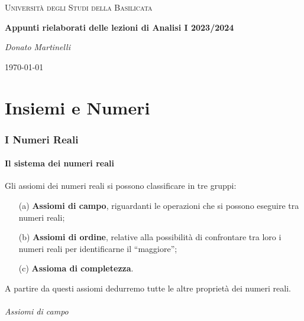 \documentclass{article}
\theoremstyle{plain}
\theoremstyle{definition}
\theoremstyle{remark}
\begin{document}
\begin{titlepage}
    \centering
	{\textsc{Università degli Studi della Basilicata} \par}
	\vspace{2cm}
    {\huge\bfseries Appunti rielaborati delle lezioni di Analisi I 2023/2024\par}
    \vfill
	{\Large\itshape Donato Martinelli\par}
	{\large \today\par}
\end{titlepage}

\tableofcontents

\vspace{50pt}
\part{Insiemi e Numeri}
\vspace{50pt}
\section{I Numeri Reali}
\vspace{50pt}

\subsection{Il sistema dei numeri reali}
\vspace{10pt}

Gli assiomi dei numeri reali si possono classificare in tre gruppi:
\begin{enumerate}
    \item[(a)] \textbf{Assiomi di campo}, riguardanti le operazioni che si possono eseguire tra numeri reali;
    \item[(b)] \textbf{Assiomi di ordine}, relative alla possibilità di confrontare tra loro i numeri reali per identificarne il “maggiore”;
    \item[(c)] \textbf{Assioma di completezza}.
\end{enumerate}
A partire da questi assiomi dedurremo tutte le altre proprietà dei numeri reali.

\vspace{10pt}
\paragraph{Assiomi di campo}
\vspace{10pt}
\end{document}
